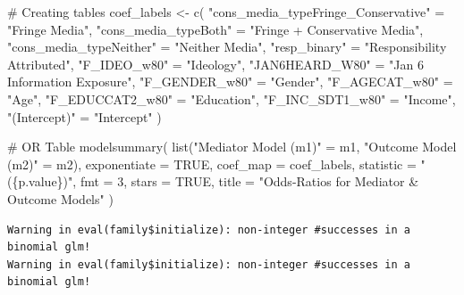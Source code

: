 \documentclass[
  letterpaper,
  DIV=11,
  numbers=noendperiod]{scrartcl}
\newenvironment{Shaded}{\begin{snugshade}}{\end{snugshade}}
\newcommand{\AttributeTok}[1]{\textcolor[rgb]{0.40,0.45,0.13}{#1}}
\newcommand{\CommentTok}[1]{\textcolor[rgb]{0.37,0.37,0.37}{#1}}
\newcommand{\ConstantTok}[1]{\textcolor[rgb]{0.56,0.35,0.01}{#1}}
\newcommand{\DecValTok}[1]{\textcolor[rgb]{0.68,0.00,0.00}{#1}}
\newcommand{\FunctionTok}[1]{\textcolor[rgb]{0.28,0.35,0.67}{#1}}
\newcommand{\NormalTok}[1]{\textcolor[rgb]{0.00,0.23,0.31}{#1}}
\newcommand{\OtherTok}[1]{\textcolor[rgb]{0.00,0.23,0.31}{#1}}
\newcommand{\StringTok}[1]{\textcolor[rgb]{0.13,0.47,0.30}{#1}}
\begin{document}
\begin{Shaded}
\begin{Highlighting}[]
\CommentTok{\# Creating tables}
\NormalTok{coef\_labels }\OtherTok{\textless{}{-}} \FunctionTok{c}\NormalTok{(}
  \StringTok{"cons\_media\_typeFringe\_Conservative"} \OtherTok{=} \StringTok{"Fringe Media"}\NormalTok{,}
  \StringTok{"cons\_media\_typeBoth"}                \OtherTok{=} \StringTok{"Fringe + Conservative Media"}\NormalTok{,}
  \StringTok{"cons\_media\_typeNeither"}             \OtherTok{=} \StringTok{"Neither Media"}\NormalTok{,}
  \StringTok{"resp\_binary"}                        \OtherTok{=} \StringTok{"Responsibility Attributed"}\NormalTok{,}
  \StringTok{"F\_IDEO\_w80"}                         \OtherTok{=} \StringTok{"Ideology"}\NormalTok{,}
  \StringTok{"JAN6HEARD\_W80"}                      \OtherTok{=} \StringTok{"Jan 6 Information Exposure"}\NormalTok{,}
  \StringTok{"F\_GENDER\_w80"}                       \OtherTok{=} \StringTok{"Gender"}\NormalTok{,}
  \StringTok{"F\_AGECAT\_w80"}                       \OtherTok{=} \StringTok{"Age"}\NormalTok{,}
  \StringTok{"F\_EDUCCAT2\_w80"}                     \OtherTok{=} \StringTok{"Education"}\NormalTok{,}
  \StringTok{"F\_INC\_SDT1\_w80"}                     \OtherTok{=} \StringTok{"Income"}\NormalTok{,}
  \StringTok{"(Intercept)"}                        \OtherTok{=} \StringTok{"Intercept"}
\NormalTok{)}

\CommentTok{\# OR Table}
\FunctionTok{modelsummary}\NormalTok{(}
  \FunctionTok{list}\NormalTok{(}\StringTok{"Mediator Model (m1)"} \OtherTok{=}\NormalTok{ m1,}
       \StringTok{"Outcome Model (m2)"}   \OtherTok{=}\NormalTok{ m2),}
  \AttributeTok{exponentiate =} \ConstantTok{TRUE}\NormalTok{,}
  \AttributeTok{coef\_map =}\NormalTok{ coef\_labels,               }
  \AttributeTok{statistic    =} \StringTok{"(\{p.value\})"}\NormalTok{,}
  \AttributeTok{fmt          =} \DecValTok{3}\NormalTok{,}
  \AttributeTok{stars        =} \ConstantTok{TRUE}\NormalTok{,}
  \AttributeTok{title        =} \StringTok{"Odds{-}Ratios for Mediator \& Outcome Models"}
\NormalTok{) }
\end{Highlighting}
\end{Shaded}

\begin{verbatim}
Warning in eval(family$initialize): non-integer #successes in a binomial glm!
Warning in eval(family$initialize): non-integer #successes in a binomial glm!
\end{verbatim}
\end{document}
